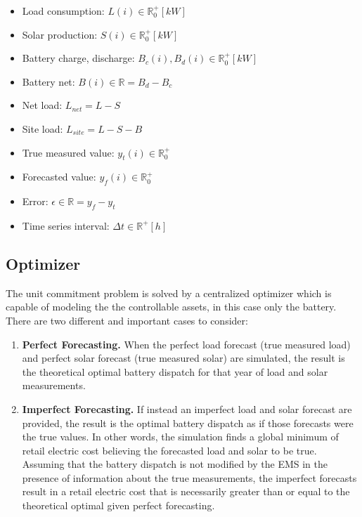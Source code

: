 \documentclass[conference]{IEEEtran}
\begin{document}
\begin{itemize}
    \item Load consumption: $ L(i) \in \mathbb{R}_0^+ [kW]$
    \item Solar production: $ S(i) \in \mathbb{R}_0^+ [kW]$ 
    \item Battery charge, discharge: $ B_{c}(i), B_{d}(i) \in \mathbb{R}_0^+ [kW]$
    \item Battery net: $ B(i) \in \mathbb{R}  = B_{d} - B_{c}$
    \item Net load: $ L_{net} = L - S$
    \item Site load: $ L_{site} = L - S - B$
    \item True measured value: $ y_t(i) \in \mathbb{R}_0^+ $
    \item Forecasted value: $ y_f(i) \in \mathbb{R}_0^+ $
    \item Error: $ \epsilon \in \mathbb{R} = y_f - y_t $
    \item Time series interval: $ \Delta t \in \mathbb{R}^+ [h] $
\end{itemize} 


\subsection{Optimizer}

The unit commitment problem is solved by a centralized optimizer which is capable of modeling the the controllable assets, in this case only the battery. There are two different and important cases to consider:

\begin{enumerate}
    \item \textbf{Perfect Forecasting.} When the perfect load forecast (true measured load) and perfect solar forecast (true measured solar) are simulated, the result is the theoretical optimal battery dispatch for that year of load and solar measurements.
    \item \textbf{Imperfect Forecasting.} If instead an imperfect load and solar forecast are provided, the result is the optimal battery dispatch as if those forecasts were the true values. In other words, the simulation finds a global minimum of retail electric cost believing the forecasted load and solar to be true. Assuming that the battery dispatch is not modified by the EMS in the presence of information about the true measurements, the imperfect forecasts result in a retail electric cost that is necessarily greater than or equal to the theoretical optimal given perfect forecasting.
\end{enumerate}
\end{document}

